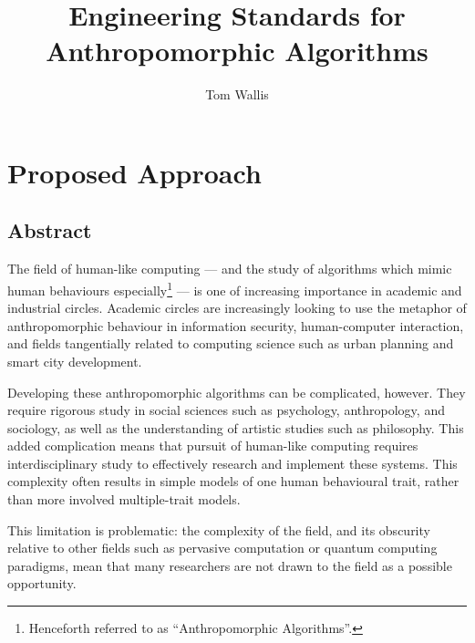 

\title{Engineering Standards for Anthropomorphic Algorithms}
\author{Tom Wallis}
\date{}
\maketitle


\section{Proposed Approach}
\label{sec:proposed_approach}
\subsection{Abstract}\label{sec:abstract}
The field of human-like computing --- and the study of algorithms which mimic human behaviours especially\footnote{Henceforth referred to as ``Anthropomorphic Algorithms''.} --- is one of increasing importance in academic and industrial circles. Academic circles are increasingly looking to use the metaphor of anthropomorphic behaviour in information security, human-computer interaction, and fields tangentially related to computing science such as urban planning and smart city development.\par

Developing these anthropomorphic algorithms can be complicated, however. They require rigorous study in social sciences such as psychology, anthropology, and sociology, as well as the understanding of artistic studies such as philosophy. This added complication means that pursuit of human-like computing requires interdisciplinary study to effectively research and implement these systems. This complexity often results in simple models of one human behavioural trait, rather than more involved multiple-trait models.\par

This limitation is problematic: the complexity of the field, and its obscurity relative to other fields such as pervasive computation or quantum computing paradigms, mean that many researchers are not drawn to the field as a possible opportunity.\par

